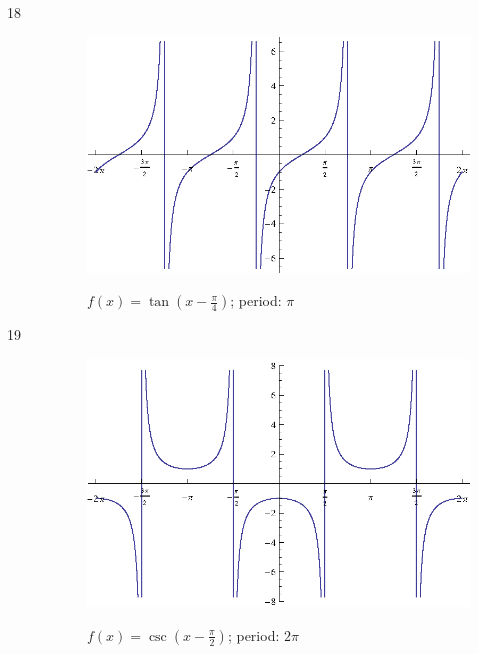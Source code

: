 \documentclass{exam}
\begin{document}
\begin{description}
      \item[18]
        \begin{figure}[H]
          \centering
          \includegraphics[scale=0.9]{exercise18.eps}

          $f(x) = \tan \left( x - \frac{\pi}{4} \right)$; period: $\pi$
        \end{figure}

      \item[19]
        \begin{figure}[H]
          \centering
          \includegraphics[scale=0.9]{exercise19.eps}

          $f(x) = \csc \left( x - \frac{\pi}{2} \right)$; period: $2 \pi$
        \end{figure}


\end{description}
\end{document}
